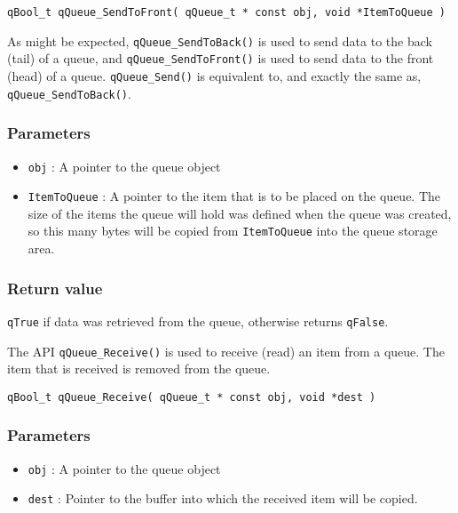 \begin{lstlisting}[style=CStyle]
qBool_t qQueue_SendToFront( qQueue_t * const obj, void *ItemToQueue )
\end{lstlisting}

As might be expected, \lstinline{qQueue_SendToBack()} is used to send data to the back (tail) of a queue, and \lstinline{qQueue_SendToFront()} is used to send data to the front (head) of a queue. \lstinline{qQueue_Send()}  is equivalent to, and exactly the same as, \lstinline{qQueue_SendToBack()}.

\subsubsection*{Parameters}
\begin{itemize}
    \item \lstinline{obj} : A pointer to the queue object
    \item \lstinline{ItemToQueue} : A pointer to the item that is to be placed on the queue. The size of the items the queue will hold was defined when the queue was created, so this many bytes will be copied from \lstinline{ItemToQueue} into the queue storage area. 
\end{itemize}  

\subsubsection*{Return value}
\lstinline{qTrue} if data was retrieved from the queue, otherwise returns \lstinline{qFalse}.

\noindent\hrulefill  

The API \lstinline{qQueue_Receive()}  is used to receive (read) an item from a queue. The item that is received is removed from the queue. 
\medskip

\begin{lstlisting}[style=CStyle]
qBool_t qQueue_Receive( qQueue_t * const obj, void *dest )
\end{lstlisting}

\subsubsection*{Parameters}
\begin{itemize}
    \item \lstinline{obj} : A pointer to the queue object
    \item \lstinline{dest} : Pointer to the buffer into which the received item will be copied.
\end{itemize}  

